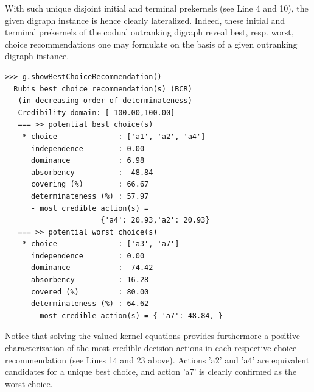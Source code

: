 With such unique disjoint initial and terminal prekernels (see Line 4 and 10), the given digraph instance is hence clearly lateralized. Indeed, these initial and terminal prekernels of the codual outranking digraph reveal best, resp. worst, choice recommendations one may formulate on the basis of a given outranking digraph instance.
\begin{lstlisting}
>>> g.showBestChoiceRecommendation()
  Rubis best choice recommendation(s) (BCR)
   (in decreasing order of determinateness)   
   Credibility domain: [-100.00,100.00]
   === >> potential best choice(s)
    * choice              : ['a1', 'a2', 'a4']
      independence        : 0.00
      dominance           : 6.98
      absorbency          : -48.84
      covering (%)        : 66.67
      determinateness (%) : 57.97
      - most credible action(s) =
                      {'a4': 20.93,'a2': 20.93}
   === >> potential worst choice(s) 
    * choice              : ['a3', 'a7']
      independence        : 0.00
      dominance           : -74.42
      absorbency          : 16.28
      covered (%)         : 80.00
      determinateness (%) : 64.62
      - most credible action(s) = { 'a7': 48.84, }
\end{lstlisting}

Notice that solving the valued \Berge kernel equations provides furthermore a positive characterization of the most credible decision actions in each respective choice recommendation (see Lines 14 and 23 above). Actions 'a2' and 'a4' are equivalent candidates for a unique best choice, and action 'a7' is clearly confirmed as the worst choice.

